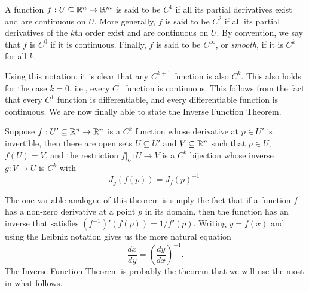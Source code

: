 \begin{definition}
    A function $f : U \subseteq \mathbb{R}^n \to \mathbb{R}^m$ is said to be $C^1$ if all its partial derivatives exist and are continuous on $U$. More generally, $f$ is said to be $C^2$ if all its partial derivatives of the $k$th order exist and are continuous on $U$. By convention, we say that $f$ is $C^0$ if it is continuous. Finally, $f$ is said to be $C^{\infty}$, or \textit{smooth}, if it is $C^k$ for all $k$.
\end{definition}

Using this notation, it is clear that any $C^{k+1}$ function is also $C^k$. This also holds for the case $k = 0$, i.e., every $C^1$ function is continuous. This follows from the fact that every $C^1$ function is differentiable, and every differentiable function is continuous. We are now finally able to state the Inverse Function Theorem. 

\begin{theorem}
    Suppose $f : U' \subseteq \mathbb{R}^n \to \mathbb{R}^n$ is a $C^k$ function whose derivative at $p \in U'$ is invertible, then there are open sets $U \subseteq U'$ and $V \subseteq \mathbb{R}^n$ such that $p \in U$, $f(U) = V$, and the restriction $f|_U : U \to V$ is a $C^k$ bijection whose inverse $g : V \to U$ is $C^k$ with
    $$J_g(f(p)) = J_f(p)^{-1}.$$
\end{theorem}

The one-variable analogue of this theorem is simply the fact that if a function $f$ has a non-zero derivative at a point $p$ in its domain, then the function has an inverse that satisfies $(f^{-1})'(f(p)) = 1/f'(p)$. Writing $y = f(x)$ and using the Leibniz notation gives us the more natural equation
$$\frac{dx}{dy} = \left(\frac{dy}{dx}\right)^{-1}.$$
The Inverse Function Theorem is probably the theorem that we will use the most in what follows.